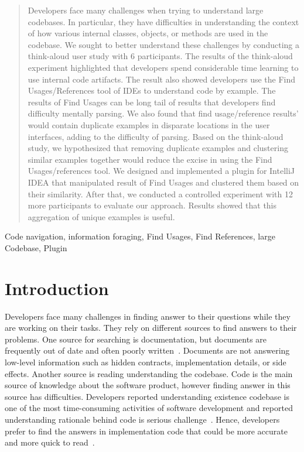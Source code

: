 \documentclass[conference]{IEEEtran}
\begin{document}
\begin{abstract}
Developers face many challenges when trying to understand large codebases. In particular, they have difficulties in understanding the context of how various internal classes, objects, or methods are used in the codebase. We sought to better understand these challenges by conducting a think-aloud user study with 6 participants. The results of the think-aloud experiment highlighted that developers spend considerable time learning to use internal code artifacts. The result also showed developers use the Find Usages/References tool of IDEs to understand code by example. The results of Find Usages can be long tail of results that developers find difficulty mentally parsing. We also found that find usage/reference results' would contain duplicate examples in disparate locations in the user interfaces, adding to the difficulty of parsing. Based on the think-aloud study, we hypothesized that removing duplicate examples and clustering similar examples together would reduce the excise in using the Find Usages/references tool. We designed and implemented a plugin for IntelliJ IDEA that manipulated result of Find Usages and clustered them based on their similarity. After that, we conducted a controlled experiment with 12 more participants to evaluate our approach. Results showed that this aggregation of unique examples is useful.
\end{abstract}

\begin{IEEEkeywords}
Code navigation, information foraging, Find Usages, Find References, large Codebase, Plugin
\end{IEEEkeywords}


\section{Introduction}

Developers face many challenges in finding answer to their questions while they are working on their tasks. They rely on different sources to find answers to their problems. One source for searching is documentation, but documents are frequently out of date and often poorly written~\cite{documentation}. Documents are not answering low-level information such as hidden contracts, implementation details, or side effects. Another source is reading understanding the codebase. Code is the main source of knowledge about the software product, however finding answer in this source has difficulties. Developers reported understanding existence codebase is one of the most time-consuming activities of software development and reported understanding rationale behind code is serious challenge~\cite{latoza2006maintaining}. Hence, developers prefer to find the answers in implementation code that could be more accurate and more quick to read~\cite{head2018not}.\par
\end{document}

